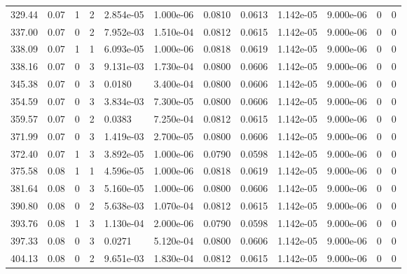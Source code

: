 \documentclass[preview]{standalone}
\begin{document}
{{{\begin{tabular}{L{1.2cm}C{1.2cm} C{0.3cm}C{0.5cm} C{1.4cm}C{1.4cm} C{1.4cm}C{1.4cm} C{1.6cm}C{1.6cm} C{1.6cm}C{1.6cm}}
  329.44  &  0.07  & 1     &  2 &  2.854e-05  & 1.000e-06  &  0.0810&   0.0613& 1.142e-05 & 9.000e-06   &  0 & 0  \\ 
  337.00  &  0.07  & 0     &  2 &  7.952e-03  & 1.510e-04  &  0.0812&   0.0615& 1.142e-05 & 9.000e-06   &  0 & 0  \\ 
  338.09  &  0.07  & 1     &  1 &  6.093e-05  & 1.000e-06  &  0.0818&   0.0619& 1.142e-05 & 9.000e-06   &  0 & 0  \\ 
  338.16  &  0.07  & 0     &  3 &  9.131e-03  & 1.730e-04  &  0.0800&   0.0606& 1.142e-05 & 9.000e-06   &  0 & 0  \\ 
  345.38  &  0.07  & 0     &  3 &  0.0180  & 3.400e-04  &  0.0800&   0.0606& 1.142e-05 & 9.000e-06   &  0 & 0  \\ 
  354.59  &  0.07  & 0     &  3 &  3.834e-03  & 7.300e-05  &  0.0800&   0.0606& 1.142e-05 & 9.000e-06   &  0 & 0  \\ 
  359.57  &  0.07  & 0     &  2 &  0.0383  & 7.250e-04  &  0.0812&   0.0615& 1.142e-05 & 9.000e-06   &  0 & 0  \\ 
  371.99  &  0.07  & 0     &  3 &  1.419e-03  & 2.700e-05  &  0.0800&   0.0606& 1.142e-05 & 9.000e-06   &  0 & 0  \\ 
  372.40  &  0.07  & 1     &  3 &  3.892e-05  & 1.000e-06  &  0.0790&   0.0598& 1.142e-05 & 9.000e-06   &  0 & 0  \\ 
  375.58  &  0.08  & 1     &  1 &  4.596e-05  & 1.000e-06  &  0.0818&   0.0619& 1.142e-05 & 9.000e-06   &  0 & 0  \\ 
  381.64  &  0.08  & 0     &  3 &  5.160e-05  & 1.000e-06  &  0.0800&   0.0606& 1.142e-05 & 9.000e-06   &  0 & 0  \\ 
  390.80  &  0.08  & 0     &  2 &  5.638e-03  & 1.070e-04  &  0.0812&   0.0615& 1.142e-05 & 9.000e-06   &  0 & 0  \\ 
  393.76  &  0.08  & 1     &  3 &  1.130e-04  & 2.000e-06  &  0.0790&   0.0598& 1.142e-05 & 9.000e-06   &  0 & 0  \\ 
  397.33  &  0.08  & 0     &  3 &  0.0271  & 5.120e-04  &  0.0800&   0.0606& 1.142e-05 & 9.000e-06   &  0 & 0  \\ 
  404.13  &  0.08  & 0     &  2 &  9.651e-03  & 1.830e-04  &  0.0812&   0.0615& 1.142e-05 & 9.000e-06   &  0 & 0  \\ 
\hline 
\end{tabular} 

}}}
\end{document}
